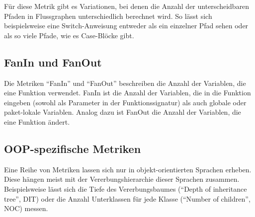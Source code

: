 Für diese Metrik gibt es Variationen, bei denen die Anzahl der unterscheidbaren Pfaden in Flussgraphen unterschiedlich berechnet wird.
So lässt sich beispielsweise eine Switch-Anweisung entweder als ein einzelner Pfad sehen oder als so viele Pfade, wie es Case-Blöcke gibt.

\subsection{FanIn und FanOut}
Die Metriken "`FanIn"' und "`FanOut"' beschreiben die Anzahl der Variablen, die eine Funktion verwendet.
FanIn ist die Anzahl der Variablen, die in die Funktion eingeben (sowohl als Parameter in der Funktionssignatur) als auch globale oder paket-lokale Variablen.
Analog dazu ist FanOut die Anzahl der Variablen, die eine Funktion ändert.

\subsection{OOP-spezifische Metriken}
Eine Reihe von Metriken lassen sich nur in objekt-orientierten Sprachen erheben.
Diese hängen meist mit der Vererbungshierarchie dieser Sprachen zusammen.
Beispielsweise lässt sich die Tiefe des Vererbungsbaumes ("`Depth of inheritance tree"', DIT) oder die Anzahl Unterklassen für jede Klasse ("`Number of children"', NOC) messen.
